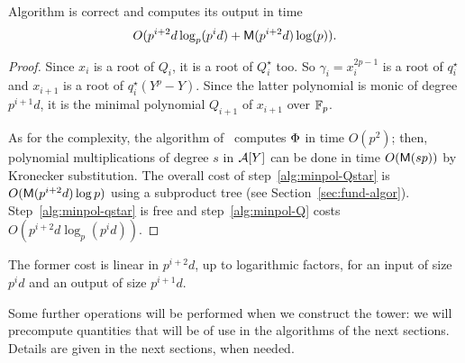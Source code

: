 \begin{theorem}
  Algorithm  is correct and computes its output
  in time
  \begin{equation}
    \label{eq:77}
    O( p^{i+2}d\log_p(p^id)+\mathsf{M}(p^{i+2}d)\log(p))
    \text{.}    
  \end{equation}
\end{theorem}
\begin{proof}
  Since $x_i$ is a root of $Q_i$, it is a root of $Q_i^\star$ too. So
  $\gamma_i=x_i^{2p-1}$ is a root of $q_i^\star$ and $x_{i+1}$ is a
  root of $q_i^\star(Y^p-Y)$. Since the latter polynomial is monic of
  degree $p^{i+1}d$, it is the minimal polynomial $Q_{i+1}$ of
  $x_{i+1}$ over $\mathbb{F}_p$.

  As for the complexity, the algorithm of~\cite{brent93} computes
  $\Phi$ in time $O(p^2)$; then, polynomial multiplications of
  degree $s$ in $\mathcal{A}[Y]$ can be done in time $O(\mathsf{M}(sp))$ by
  Kronecker substitution. The overall cost of
  step~\ref{alg:minpol-Qstar} is $O(\mathsf{M}(p^{i+2}d)\log p)$ using a
  subproduct tree (see
  Section~\ref{sec:fund-algor}). Step~\ref{alg:minpol-qstar} is free
  and step~\ref{alg:minpol-Q} costs $O(p^{i+2}d\log_p(p^id))$.
\end{proof}

The former cost is linear in $p^{i+2}d$, up to logarithmic factors,
for an input of size $p^id$ and an output of size $p^{i+1}d$.

Some further operations will be performed when we construct the tower:
we will precompute quantities that will be of use in the algorithms of
the next sections. Details are given in the next sections, when
needed.


%
